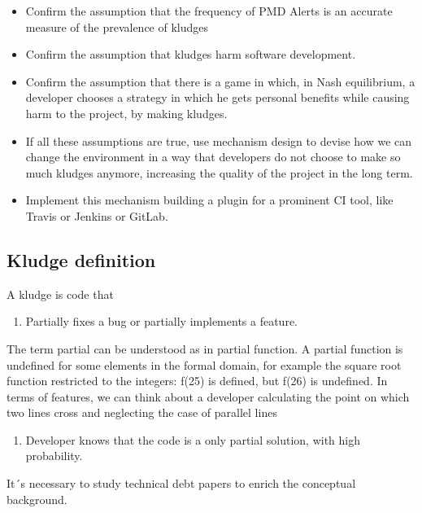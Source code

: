 \documentclass[
]{article}
\providecommand{\tightlist}{%
  \setlength{\itemsep}{0pt}\setlength{\parskip}{0pt}}
\begin{document}
\begin{itemize}
\item
  Confirm the assumption that the frequency of PMD Alerts is an accurate
  measure of the prevalence of kludges
\item
  Confirm the assumption that kludges harm software development.
\item
  Confirm the assumption that there is a game in which, in Nash
  equilibrium, a developer chooses a strategy in which he gets personal
  benefits while causing harm to the project, by making kludges.
\item
  If all these assumptions are true, use mechanism design to devise how
  we can change the environment in a way that developers do not choose
  to make so much kludges anymore, increasing the quality of the project
  in the long term.
\item
  Implement this mechanism building a plugin for a prominent CI tool,
  like Travis or Jenkins or GitLab.
\end{itemize}

\subsection{Kludge definition}\label{kludge definition}

A kludge is code that

\begin{enumerate}
\def\labelenumi{\arabic{enumi}.}
\tightlist
\item
  Partially fixes a bug or partially implements a feature.
\end{enumerate}

The term partial can be understood as in partial function. A partial
function is undefined for some elements in the formal domain, for
example the square root function restricted to the integers: f(25) is
defined, but f(26) is undefined. In terms of features, we can think
about a developer calculating the point on which two lines cross and
neglecting the case of parallel lines

\begin{enumerate}
\def\labelenumi{\arabic{enumi}.}
\setcounter{enumi}{1}
\tightlist
\item
  Developer knows that the code is a only partial solution, with high
  probability.
\end{enumerate}

It´s necessary to study technical debt papers to enrich the conceptual
background.
\end{document}
